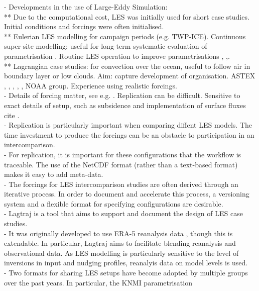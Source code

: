 \documentclass[a4paper,11pt]{article}
\begin{document}
- Developments in the use of Large-Eddy Simulation: \\
** Due to the computational cost, LES was initially used for short
case studies. Initial conditions and forcings were often initialised. \\
** Eulerian LES modelling for campaign periods (e.g. TWP-ICE).
Continuous super-site modelling: useful for long-term systematic
evaluation of parametrisation \cite{neggers2012}. Routine LES operation
to improve parametrisations
\cite{schalkwijk2015}, \cite{laar2019},\cite{gustafson2020}. \\
** Lagrangian case studies: for convection over the ocean, useful to
follow air in boundary layer or low clouds. Aim: capture development of
organisation. ASTEX \cite{bretherton1999}, \cite{roode2016},
\cite{tomassini2017}, \cite{mohrmann2019}, \cite{neggers2019}, NOAA
group. Experience using realistic forcings. \\
- Details of forcing matter, see e.g. \cite{smalley2019}. Replication
can be difficult. Sensitive to exact details of setup, such as
subsidence \citep{hohenegger2013,kurowski2020} and implementation of
surface fluxes cite \citep{stevens2001}. \\
- Replication is particularly important when comparing diffent LES
models. The time investment to produce the forcings can be an obstacle
to participation in an intercomparison. \\
- For replication, it is important for these configurations that the
workflow is traceable. The use of the NetCDF format (rather than a
text-based format) makes it easy to add meta-data. \\
- The forcings for LES intercomparison studies are often derived
through an iterative process. In order to document and accelerate this
process, a versioning system and a flexible format for specifying
configurations are desirable. \\
- Lagtraj is a tool that aims to support and document the design of LES
case studies. \\
- It was originally developed to use ERA-5 reanalysis data
\citep{hersbach2020}, though this is extendable. In particular, Lagtraj
aims to facilitate blending reanalysis and observational data. As LES
modelling is particularly sensitive to the level of inversions in input
and nudging profiles, reanalyis data on model levels is used. \\
- Two formats for sharing LES setups have become adopted by multiple
groups over the past years. In particular, the KNMI parametrisation
\end{document}
